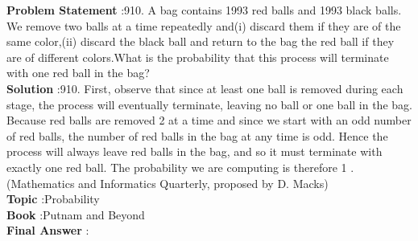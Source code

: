 \documentclass[10pt]{article}
\begin{document}
\textbf{Problem Statement} :910. A bag contains 1993 red balls and 1993 black balls. We remove two balls at a time repeatedly and(i) discard them if they are of the same color,(ii) discard the black ball and return to the bag the red ball if they are of different colors.What is the probability that this process will terminate with one red ball in the bag?\\
\textbf{Solution} :910. First, observe that since at least one ball is removed during each stage, the process will eventually terminate, leaving no ball or one ball in the bag. Because red balls are removed 2 at a time and since we start with an odd number of red balls, the number of red balls in the bag at any time is odd. Hence the process will always leave red balls in the bag, and so it must terminate with exactly one red ball. The probability we are computing is therefore 1 .(Mathematics and Informatics Quarterly, proposed by D. Macks) \\
\textbf{Topic} :Probability\\
\textbf{Book} :Putnam and Beyond\\
\textbf{Final Answer} :\\
\end{document}
